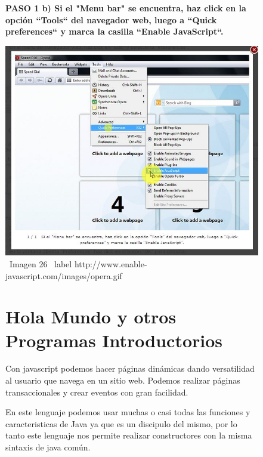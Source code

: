 \documentclass[11pt]{article} %
\begin{document}
\begin{figure}
\begin{center}

\begin{center}
\bf PASO 1
 b) Si el "Menu bar" se encuentra, haz click en la opción ``Tools`` del navegador web, luego a ``Quick preferences`` y marca la casilla ``Enable JavaScript``.
\end{center}

\includegraphics[height=8 cm, width=8 cm] {imagenes/opera 02.jpg}
\newline
\newline
\ Imagen 26
\ label {http://www.enable-javascript.com/images/opera.gif}



\section{Hola Mundo y otros Programas Introductorios} 

Con javascript podemos hacer páginas dinámicas dando versatilidad al usuario que navega en un sitio web. Podemos realizar páginas transaccionales y crear eventos con gran facilidad.



En este lenguaje podemos usar muchas o casi todas las funciones y caracteristicas de Java ya que es un discipulo del mismo, por lo tanto este lenguaje nos permite realizar constructores con la misma sintaxis de java común.



\end{center}
\end{figure}
\end{document}
